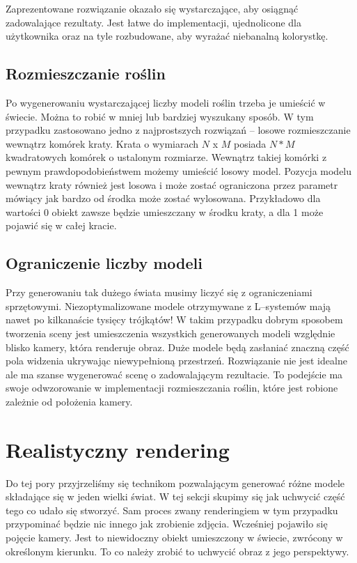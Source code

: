 \documentclass[inz,longabstract]{iithesis}
\begin{document}
        Zaprezentowane rozwiązanie okazało się wystarczające, aby osiągnąć zadowalające rezultaty. Jest łatwe do implementacji, ujednolicone dla użytkownika oraz na tyle rozbudowane, aby wyrażać niebanalną kolorystkę.
        
    \section{Rozmieszczanie roślin}
        Po wygenerowaniu wystarczającej liczby modeli roślin trzeba je umieścić w świecie. Można to robić w mniej lub bardziej wyszukany sposób. W tym przypadku zastosowano jedno z najprostszych rozwiązań -- losowe rozmieszczanie wewnątrz komórek kraty. Krata o wymiarach $N$ x $M$ posiada $N * M$ kwadratowych komórek o ustalonym rozmiarze. Wewnątrz takiej komórki z pewnym prawdopodobieństwem możemy umieścić losowy model. Pozycja modelu wewnątrz kraty również jest losowa i może zostać ograniczona przez parametr mówiący jak bardzo od środka może zostać wylosowana. Przykładowo dla wartości 0 obiekt zawsze będzie umieszczany w środku kraty, a dla 1 może pojawić się w całej kracie. 
        
    \section{Ograniczenie liczby modeli}
        Przy generowaniu tak dużego świata musimy liczyć się z ograniczeniami sprzętowymi. Niezoptymalizowane modele otrzymywane z L--systemów mają nawet po kilkanaście tysięcy trójkątów! W takim przypadku dobrym sposobem tworzenia sceny jest umieszczenia wszystkich generowanych modeli względnie blisko kamery, która renderuje obraz. Duże modele będą zasłaniać znaczną część pola widzenia ukrywając niewypełnioną przestrzeń. Rozwiązanie nie jest idealne ale ma szanse wygenerować scenę o zadowalającym rezultacie. To podejście ma swoje odwzorowanie w implementacji rozmieszczania roślin, które jest robione zależnie od położenia kamery.
        
\chapter{Realistyczny rendering}
    Do tej pory przyjrzeliśmy się technikom pozwalającym generować różne modele składające się w jeden wielki świat. W tej sekcji skupimy się jak uchwycić część tego co udało się stworzyć. Sam proces zwany renderingiem w tym przypadku przypominać będzie nic innego jak zrobienie zdjęcia. Wcześniej pojawiło się pojęcie kamery. Jest to niewidoczny obiekt umieszczony w świecie, zwrócony w określonym kierunku. To co należy zrobić to uchwycić obraz z jego perspektywy. 
    
\end{document}
